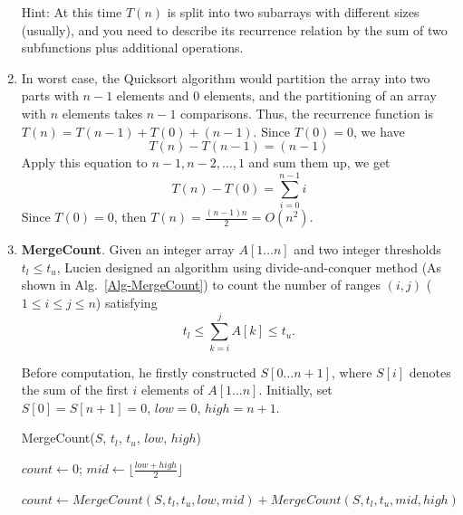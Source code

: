 \documentclass[12pt,a4paper]{article}
\makeatletter
\newtheorem*{solution}{Solution}
\theoremstyle{definition}
\renewenvironment{solution}[1][Solution] {\par\pushQED{\qed}\normalfont\topsep6\p@\@plus6\p@\relax\trivlist\item[\hskip\labelsep\bfseries#1\@addpunct{.}]\ignorespaces}{\popQED\endtrivlist\@endpefalse} \makeatother
\makeatother
\begin{document}
\begin{enumerate}
    {\color{purple}Hint: At this time $T(n)$ is split into two subarrays with different sizes (usually), and you need to describe its recurrence relation by the sum of two subfunctions plus additional operations.}
	\begin{solution}
		In worst case, the Quicksort algorithm would partition the array into two parts with $n-1$ elements and $0$ elements, and the partitioning of an array with $n$ elements takes $n-1$ comparisons. Thus, the recurrence function is $T(n) = T(n-1) + T(0) + (n-1)$. Since $T(0) = 0$, we have $$T(n) - T(n-1) = (n-1)$$ Apply this equation to $n-1, n-2,\dots,1$ and sum them up, we get $$T(n) - T(0) = \sum_{i=0}^{n-1}i$$ Since $T(0) = 0$, then $T(n) = \frac{(n-1)n}{2} = O(n^{2})$.
	\end{solution}
    \item
    \textbf{MergeCount}. Given an integer array $A[1 \ldots n]$ and two integer thresholds $t_l \le t_u$, Lucien designed an algorithm using divide-and-conquer method (As shown in Alg.~\ref{Alg-MergeCount}) to count the number of ranges $(i,j)$ ($1 \leq i \leq j \leq n$) satisfying
    \begin{equation}\label{Eqn-MergeCount}
    t_l \leq \sum_{k=i}^{j}{A[k]} \leq t_u.
    \end{equation}

    Before computation, he firstly constructed $S[0 \ldots n+1]$, where $S[i]$ denotes the sum of the first $i$ elements of $A[1 \ldots n]$. Initially, set $S[0]=S[n+1]=0$, $low=0$, $high=n+1$.

\begin{minipage}[t]{0.90\textwidth}
	\begin{algorithm}[H]
		\BlankLine
		\caption{MergeCount($S$, $t_l$, $t_u$, $low$, $high$)}
		\label{Alg-MergeCount}
		
		$count \leftarrow 0$; $mid\leftarrow \lfloor \frac{low+high}{2} \rfloor$\;
		
		
		$count\leftarrow MergeCount(S, t_l, t_u, low, mid)+ MergeCount(S, t_l, t_u, mid, high)$\;
		
\end{algorithm}
\end{minipage}
\end{enumerate}
\end{document}
